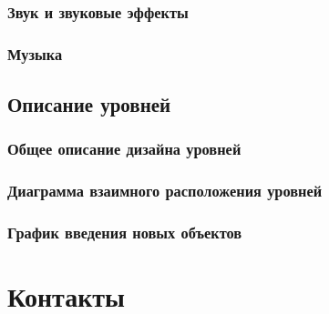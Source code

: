 \documentclass{article}
\begin{document}
\subsubsection{Звук и звуковые эффекты}

\subsubsection{Музыка}

\subsection{Описание уровней}

\subsubsection{Общее описание дизайна уровней}

\subsubsection{Диаграмма взаимного расположения уровней}

\subsubsection{График введения новых объектов}

\section{Контакты}
\end{document}
